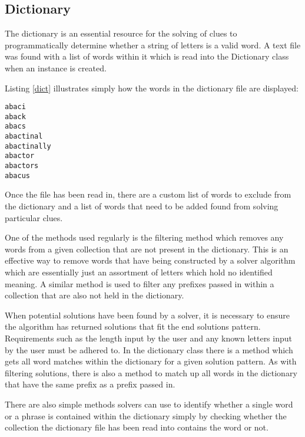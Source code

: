 \subsection{Dictionary}

The dictionary is an essential resource for the solving of clues to 
programmatically determine whether a string of letters is a valid word. 
A text file was found with a list of words within it which is read into the 
Dictionary class when an instance is created.

Listing \ref{dict} illustrates simply how the words in the dictionary file are
displayed:

\begin{lstlisting}[caption={A sample of the dictionary file},
                   label=dict]  
abaci
aback
abacs
abactinal
abactinally
abactor
abactors
abacus
\end{lstlisting}

Once the file has been read in, there are a custom list of words to  exclude
from the dictionary and a list of words that need to be added  found from
solving particular clues.

One of the methods used regularly is the filtering method which removes any
words from a given collection that are not present in the dictionary. This is an
effective way to remove words that have being constructed by a solver algorithm
which are essentially just an assortment of letters which hold no identified
meaning.  A similar method is used to filter any prefixes passed in within a
collection that are  also not held in the dictionary.

When potential solutions have been found by a solver, it is necessary to ensure
the algorithm has returned solutions that fit the end solutions pattern.
Requirements  such as the length input by the user and any known letters input
by the user must  be adhered to. In the dictionary class there is a method which
gets all word matches  within the dictionary for a given solution pattern. As
with filtering solutions, there is  also a method to match up all words in the
dictionary that have the same prefix as  a prefix passed in.

There are also simple methods solvers can use to identify whether a single word
or a  phrase is contained within the dictionary simply by checking whether the
collection the  dictionary file has been read into contains the word or not.

